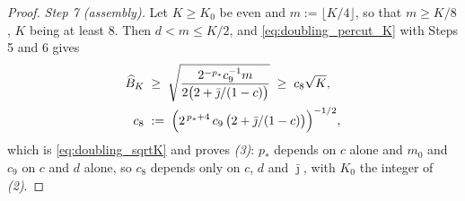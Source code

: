 \begin{proof}
\emph{Step 7 (assembly).} Let $K\geq K_0$ be even and $m:=\lfloor K/4\rfloor$, so that
$m\geq K/8$, $K$ being at least $8$. Then $d<m\leq K/2$, and \eqref{eq:doubling_percut_K} with
Steps 5 and 6 gives
\begin{equation}
\begin{aligned}
    \widehat B_K\;&\geq\;\sqrt{\frac{2^{-p_*}c_9^{-1}m}{2\bigl(2+\bar\jmath/(1-c)\bigr)}}
    \;\geq\;c_8\sqrt K,\\
    c_8\;&:=\;\Bigl(2^{\,p_*+4}\,c_9\,\bigl(2+\bar\jmath/(1-c)\bigr)\Bigr)^{-1/2} ,
\end{aligned}
\end{equation}
which is \eqref{eq:doubling_sqrtK} and proves \emph{(3)}: $p_*$ depends on $c$ alone and
$m_0$ and $c_9$ on $c$ and $d$ alone, so $c_8$ depends only on $c$, $d$ and $\bar\jmath$, with
$K_0$ the integer of \emph{(2)}.
\end{proof}

